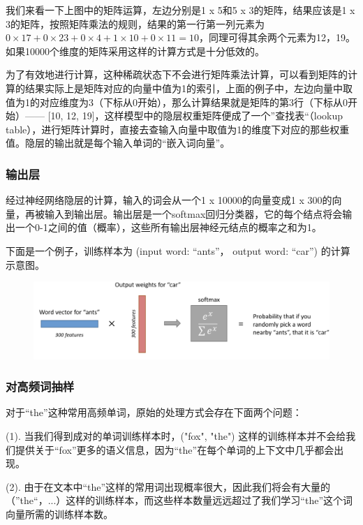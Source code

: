 \documentclass[12pt]{article}
\begin{document}
我们来看一下上图中的矩阵运算，左边分别是1 x 5和5 x 3的矩阵，结果应该是1 x 3的矩阵，按照矩阵乘法的规则，结果的第一行第一列元素为$ 0 \times 17 + 0 \times 23 + 0 \times 4 + 1 \times 10 + 0 \times 11 = 10$，同理可得其余两个元素为12，19。如果10000个维度的矩阵采用这样的计算方式是十分低效的。

为了有效地进行计算，这种稀疏状态下不会进行矩阵乘法计算，可以看到矩阵的计算的结果实际上是矩阵对应的向量中值为1的索引，上面的例子中，左边向量中取值为1的对应维度为3（下标从0开始），那么计算结果就是矩阵的第3行（下标从0开始）—— [10, 12, 19]，这样模型中的隐层权重矩阵便成了一个”查找表“（lookup table），进行矩阵计算时，直接去查输入向量中取值为1的维度下对应的那些权重值。隐层的输出就是每个输入单词的“嵌入词向量”。

\subsubsection{输出层}
经过神经网络隐层的计算，输入的词会从一个1 x 10000的向量变成1 x 300的向量，再被输入到输出层。输出层是一个softmax回归分类器，它的每个结点将会输出一个0-1之间的值（概率），这些所有输出层神经元结点的概率之和为1。

下面是一个例子，训练样本为 (input word: “ants”， output word: “car”) 的计算示意图。
\begin{figure}[H]
    \centering
    \includegraphics[width=1\textwidth]{fig/Embedding_Output_Compute_Example.png}
\end{figure}

\subsubsection{对高频词抽样}
对于“the”这种常用高频单词，原始的处理方式会存在下面两个问题：

(1). 当我们得到成对的单词训练样本时，("fox", "the") 这样的训练样本并不会给我们提供关于“fox”更多的语义信息，因为“the”在每个单词的上下文中几乎都会出现。

(2). 由于在文本中“the”这样的常用词出现概率很大，因此我们将会有大量的（”the“，...）这样的训练样本，而这些样本数量远远超过了我们学习“the”这个词向量所需的训练样本数。
\end{document}
